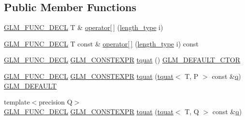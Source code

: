 \subsection*{Public Member Functions}
\begin{DoxyCompactItemize}
\item 
\mbox{\hyperlink{setup_8hpp_ab2d052de21a70539923e9bcbf6e83a51}{G\+L\+M\+\_\+\+F\+U\+N\+C\+\_\+\+D\+E\+CL}} T \& \mbox{\hyperlink{structglm_1_1tquat_a7c9434d6e90ddc03ed8b91770765303c}{operator\mbox{[}$\,$\mbox{]}}} (\mbox{\hyperlink{structglm_1_1tquat_ab3ef67a20d129dcb01f042042218ba17}{length\+\_\+type}} i)
\item 
\mbox{\hyperlink{setup_8hpp_ab2d052de21a70539923e9bcbf6e83a51}{G\+L\+M\+\_\+\+F\+U\+N\+C\+\_\+\+D\+E\+CL}} T const  \& \mbox{\hyperlink{structglm_1_1tquat_a868440e3dade7ee013bf9114285b8790}{operator\mbox{[}$\,$\mbox{]}}} (\mbox{\hyperlink{structglm_1_1tquat_ab3ef67a20d129dcb01f042042218ba17}{length\+\_\+type}} i) const
\item 
\mbox{\hyperlink{setup_8hpp_ab2d052de21a70539923e9bcbf6e83a51}{G\+L\+M\+\_\+\+F\+U\+N\+C\+\_\+\+D\+E\+CL}} \mbox{\hyperlink{setup_8hpp_a08b807947b47031d3a511f03f89645ad}{G\+L\+M\+\_\+\+C\+O\+N\+S\+T\+E\+X\+PR}} \mbox{\hyperlink{structglm_1_1tquat_ad45a7fd79d31014055fa749078b78cbf}{tquat}} () \mbox{\hyperlink{setup_8hpp_afb97a4e995bc004c0cbbfa22125b80ba}{G\+L\+M\+\_\+\+D\+E\+F\+A\+U\+L\+T\+\_\+\+C\+T\+OR}}
\item 
\mbox{\hyperlink{setup_8hpp_ab2d052de21a70539923e9bcbf6e83a51}{G\+L\+M\+\_\+\+F\+U\+N\+C\+\_\+\+D\+E\+CL}} \mbox{\hyperlink{setup_8hpp_a08b807947b47031d3a511f03f89645ad}{G\+L\+M\+\_\+\+C\+O\+N\+S\+T\+E\+X\+PR}} \mbox{\hyperlink{structglm_1_1tquat_aa7af0d1b2fd1ed7db63d48b241b295ca}{tquat}} (\mbox{\hyperlink{structglm_1_1tquat}{tquat}}$<$ T, P $>$ const \&\mbox{\hyperlink{glad_8h_a514729309336df22bcc8eda979d6ced4}{q}}) \mbox{\hyperlink{setup_8hpp_aefce7051c376a64ba89fa93a9f63bc2c}{G\+L\+M\+\_\+\+D\+E\+F\+A\+U\+LT}}
\item 
{\footnotesize template$<$precision Q$>$ }\\\mbox{\hyperlink{setup_8hpp_ab2d052de21a70539923e9bcbf6e83a51}{G\+L\+M\+\_\+\+F\+U\+N\+C\+\_\+\+D\+E\+CL}} \mbox{\hyperlink{setup_8hpp_a08b807947b47031d3a511f03f89645ad}{G\+L\+M\+\_\+\+C\+O\+N\+S\+T\+E\+X\+PR}} \mbox{\hyperlink{structglm_1_1tquat_aaf9a4d10e16ad975e4462b5c89ce724d}{tquat}} (\mbox{\hyperlink{structglm_1_1tquat}{tquat}}$<$ T, Q $>$ const \&\mbox{\hyperlink{glad_8h_a514729309336df22bcc8eda979d6ced4}{q}})
\item 

\end{DoxyCompactItemize}
